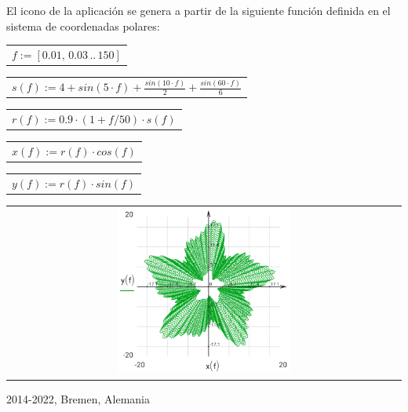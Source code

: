 \documentclass[DIV=calc, paper=a4, fontsize=11pt, twocolumn]{scrartcl}
\begin{document}
El icono de la aplicación se genera a
partir de la siguiente función
definida en el sistema de coordenadas
polares:
\begin{center}\begin{tabular}{c}
                $f := \left[ 0.01,\, 0.03 \,..\, 150 \right]$
\end{tabular}\end{center}
\begin{center}\begin{tabular}{c}
                $s(f) := 4 + sin \left( 5 \cdot f\right)  + \frac{sin \left( 10 \cdot f\right) }{2} + \frac{sin \left( 60 \cdot f\right) }{6}$
\end{tabular}\end{center}
\begin{center}\begin{tabular}{c}
                $r(f) := 0.9 \cdot \left( 1 + f / 50 \right) \cdot s \left( f\right) $
\end{tabular}\end{center}
\begin{center}\begin{tabular}{c}
                $x(f) := r \left( f\right)  \cdot cos \left( f\right) $
\end{tabular}\end{center}
\begin{center}\begin{tabular}{c}
                $y(f) := r \left( f\right)  \cdot sin \left( f\right) $
\end{tabular}\end{center}
\begin{center}\begin{tabular}{c} \includegraphics[width=0.45\textwidth]{graphics/about_micromath_fig1.png} \end{tabular}\end{center}

2014-2022, Bremen, Alemania
\end{document}
